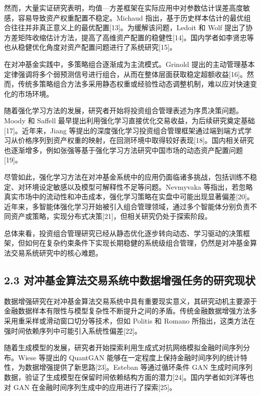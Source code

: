 \documentclass[UTF8]{ctexart}
\begin{document}
然而，大量实证研究表明，均值---方差框架在实际应用中对参数估计误差高度敏感，容易导致资产权重配置不稳定。Michaud
指出，基于历史样本估计的最优组合往往并非真正意义上的最优配置{[}13{]}。为缓解该问题，Ledoit
和 Wolf
提出了协方差矩阵收缩估计方法，提高了高维资产配置的稳健性{[}14{]}。国内学者如李贤忠等也从稳健优化角度对资产配置问题进行了系统研究{[}15{]}。

在对冲基金实践中，多策略组合逐渐成为主流模式。Grinold
提出的主动管理基本定律强调将多个弱预测信号进行组合，从而在整体层面获取稳定超额收益{[}16{]}。然而，传统多策略组合方法多采用静态权重或经验性动态调整机制，难以应对快速变化的市场环境。

随着强化学习方法的发展，研究者开始将投资组合管理表述为序贯决策问题。Moody
和 Saffell
最早提出利用强化学习直接优化交易收益，为后续研究奠定基础{[}17{]}。近年来，Jiang
等提出的深度强化学习投资组合管理框架通过端到端方式学习从价格序列到资产权重的映射，在回测环境中取得较好表现{[}18{]}。国内相关研究也逐渐增多，例如张强等基于强化学习方法研究中国市场的动态资产配置问题{[}19{]}。

尽管如此，强化学习方法在对冲基金系统中的应用仍面临诸多挑战，包括训练不稳定、对环境设定敏感以及模型可解释性不足等问题。Nevmyvaka
等指出，若忽略真实市场中的流动性和冲击成本，强化学习策略在实盘中可能出现显著偏差{[}20{]}。近年来，多智能体强化学习开始被引入组合管理领域，通过多个智能体分别负责不同资产或策略，实现分布式决策{[}21{]}，但相关研究仍处于探索阶段。

总体来看，投资组合管理研究已经从静态优化逐步转向动态、学习驱动的决策框架，但如何在复杂约束条件下实现长期稳健的系统级组合管理，仍然是对冲基金算法交易系统研究中的核心难题。

\subsection{2.3
对冲基金算法交易系统中数据增强任务的研究现状}\label{ux5bf9ux51b2ux57faux91d1ux7b97ux6cd5ux4ea4ux6613ux7cfbux7edfux4e2dux6570ux636eux589eux5f3aux4efbux52a1ux7684ux7814ux7a76ux73b0ux72b6}

数据增强研究在对冲基金算法交易系统中具有重要现实意义，其研究动机主要源于金融数据样本有限性与模型复杂性不断提升之间的矛盾。传统金融数据增强方法多采用重采样或滑动窗口切分等技术，但如
Politis 和 Romano
所指出，这类方法在强时间依赖序列中可能引入系统性偏差{[}22{]}。

随着生成模型的发展，研究者开始探索利用生成式对抗网络模拟金融时间序列分布。Wiese
等提出的 QuantGAN
能够在一定程度上保持金融时间序列的统计特性，为数据增强提供了新思路{[}23{]}。Esteban
等通过循环条件 GAN
生成时间序列数据，验证了生成模型在保留时间依赖结构方面的潜力{[}24{]}。国内学者如刘洋等也对
GAN 在金融时间序列生成中的应用进行了探索{[}25{]}。
\end{document}
